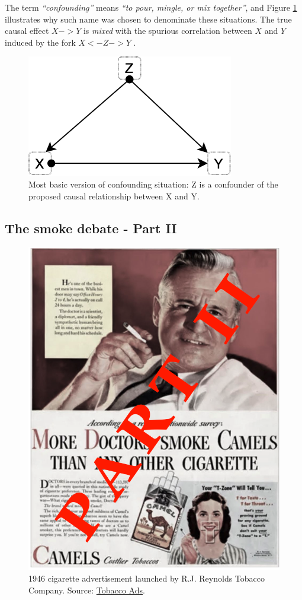 \documentclass[
]{book}
\begin{document}
The term \emph{``confounding''} means \emph{``to pour, mingle, or mix together''}, and Figure \ref{fig:confounder-simple} illustrates why such name was chosen to denominate these situations. The true causal effect \(X -> Y\) is \emph{mixed} with the spurious correlation between \(X\) and \(Y\) induced by the fork \(X <- Z -> Y\) \citep{book-of-why}.

\begin{figure}

{\centering \includegraphics[width=0.33\linewidth]{Figures/causal_diagram_confounder_simple} 

}

\caption{Most basic version of confounding situation: Z is a confounder of the proposed causal relationship between X and Y.}\label{fig:confounder-simple}
\end{figure}

\hypertarget{the-smoke-debate---part-ii}{%
\subsection{The smoke debate - Part II}\label{the-smoke-debate---part-ii}}



\begin{figure}

{\centering \includegraphics[width=0.33\linewidth]{Figures/smoke_debate_part2} 

}

\caption{1946 cigarette advertisement launched by R.J. Reynolds Tobacco Company. Source: \href{https://tobacco.stanford.edu/cigarettes/doctors-smoking/more-doctors-smoke-camels/}{Tobacco Ads}.}\label{fig:smoke-debate-part-two}
\end{figure}
\end{document}
